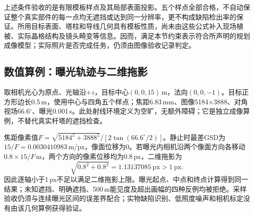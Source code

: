 上述条件验收的是有限模板样点及其局部表面投影。五个样点全部合格，不自动保证整个真实部件的每一点均无遮挡或达到同一分辨率，更不构成缺陷检出率的保证。所用目标表面、塔柱和导线几何具有模板性质，尚未由这些公式补入现场植被、实际晶格结构及镜头畸变等信息。因而，满足本节约束表示符合所声明的规划成像模型；实际照片是否完成任务，仍须由图像验收记录判定。

\subsection{数值算例：曝光轨迹与二维拖影}

取相机光心为原点、光轴沿$+z$，目标中心$(0,0,15)$\,m，法向$(0,0,-1)$。目标正方形边长0.5\,m，使用中心与四角五个样点；焦距6.83\,mm、图像5184$\times$3888、对角视场66.6$^\circ$、曝光0.001\,s。此处射线环境定义为空旷，无额外障碍；它是独立成像算例，不替代真实杆塔的遮挡检查。

焦距像素值$F=\sqrt{5184^2+3888^2}/[2\tan(66.6^\circ/2)]$。静止时最差GSD为$15/F=0.0030410983$\,m/px，像面位移为0。若曝光内相机沿两个像面方向各移动$0.8\times15/F$\,m，两个方向的像素位移均为0.8\,px，二维拖影为
\begin{equation}
 \sqrt{0.8^2+0.8^2}=1.13137085\ \mathrm{px}>1\ \mathrm{px}.
\end{equation}
因此逐轴小于1\,px不足以满足二维拖影上限。曝光起点、中点和终点计算得到同一结果；未知遮挡、明确遮挡、500\,m能见度及超出画幅的四种反例均被拒绝。采样验收仍须与连续曝光区间的误差界配合；实物缺陷识别、低照度噪声和相机标定没有由该几何算例获得验证。
